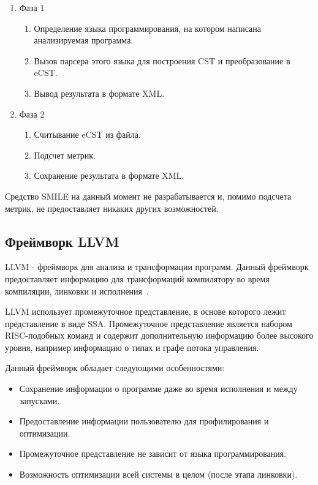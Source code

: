 \begin{enumerate}
    \item Фаза 1
    \begin{enumerate}
        \item Определение языка программирования, на котором написана
        анализируемая программа.
        \item Вызов парсера этого языка для построения CST и преобразование в
        eCST.
        \item Вывод результата в формате XML.
    \end{enumerate}

    \item Фаза 2
    \begin{enumerate}
        \item Считывание eCST из файла.
        \item Подсчет метрик.
        \item Сохранение результата в формате XML.
    \end{enumerate}
\end{enumerate}

Средство SMILE на данный момент не разрабатывается и, помимо подсчета метрик, не
предоставляет никаких других возможностей.

\subsection{Фреймворк LLVM}


LLVM - фреймворк для анализа и трансформации программ. Данный фреймворк
предоставляет информацию для трансформаций компилятору во время компиляции,
линковки и исполнения~\cite{llvm}.

LLVM использует промежуточное представление, в основе которого лежит
представление в виде SSA. Промежуточное представление является набором
RISC-подобных команд и содержит дополнительную информацию более высокого уровня,
например информацию о типах и графе потока управления.

Данный фреймворк обладает следующими особенностями:

\begin{itemize}
    \item Сохранение информации о программе даже во время исполнения и между
    запусками.
    \item Предоставление информации пользователю для профилирования и
    оптимизации.
    \item Промежуточное представление не зависит от языка программирования.
    \item Возможность оптимизации всей системы в целом (после этапа линковки).
\end{itemize}

